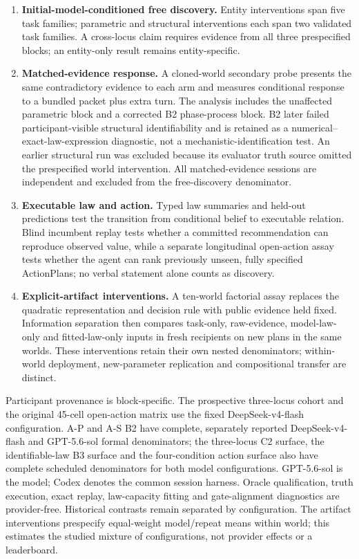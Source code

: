 \documentclass[10pt,twocolumn]{article}
\providecommand{\tightlist}{%
  \setlength{\itemsep}{0pt}\setlength{\parskip}{0pt}}
\begin{document}
\begin{enumerate}
\def\labelenumi{\arabic{enumi}.}
\tightlist
\item
  \textbf{Initial-model-conditioned free discovery.} Entity
  interventions span five task families; parametric and structural
  interventions each span two validated task families. A cross-locus
  claim requires evidence from all three prespecified blocks; an
  entity-only result remains entity-specific.
\item
  \textbf{Matched-evidence response.} A cloned-world secondary probe
  presents the same contradictory evidence to each arm and measures
  conditional response to a bundled packet plus extra turn. The analysis
  includes the unaffected parametric block and a corrected B2
  phase-process block. B2 later failed participant-visible structural
  identifiability and is retained as a numerical--exact-law-expression
  diagnostic, not a mechanistic-identification test. An earlier
  structural run was excluded because its evaluator truth source omitted
  the prespecified world intervention. All matched-evidence sessions are
  independent and excluded from the free-discovery denominator.
\item
  \textbf{Executable law and action.} Typed law summaries and held-out
  predictions test the transition from conditional belief to executable
  relation. Blind incumbent replay tests whether a committed
  recommendation can reproduce observed value, while a separate
  longitudinal open-action assay tests whether the agent can rank
  previously unseen, fully specified ActionPlans; no verbal statement
  alone counts as discovery.
\item
  \textbf{Explicit-artifact interventions.} A ten-world factorial assay
  replaces the quadratic representation and decision rule with public
  evidence held fixed. Information separation then compares task-only,
  raw-evidence, model-law-only and fitted-law-only inputs in fresh
  recipients on new plans in the same worlds. These interventions retain
  their own nested denominators; within-world deployment, new-parameter
  replication and compositional transfer are distinct.
\end{enumerate}

Participant provenance is block-specific. The prospective three-locus
cohort and the original 45-cell open-action matrix use the fixed
DeepSeek-v4-flash configuration. A-P and A-S B2 have complete,
separately reported DeepSeek-v4-flash and GPT-5.6-sol formal
denominators; the three-locus C2 surface, the identifiable-law B3
surface and the four-condition action surface also have complete
scheduled denominators for both model configurations. GPT-5.6-sol is the
model; Codex denotes the common session harness. Oracle qualification,
truth execution, exact replay, law-capacity fitting and gate-alignment
diagnostics are provider-free. Historical contrasts remain separated by
configuration. The artifact interventions prespecify equal-weight
model/repeat means within world; this estimates the studied mixture of
configurations, not provider effects or a leaderboard.
\end{document}
